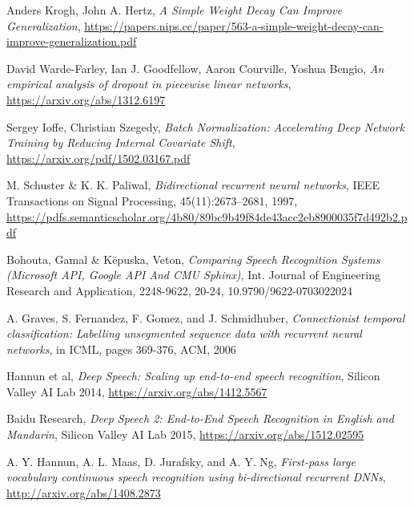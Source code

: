 \documentclass[licencjacka,en]{pracamgr}
\begin{document}
	\begin{thebibliography}{99}
		
		 Anders Krogh, John A. Hertz, \textit{A Simple Weight Decay Can Improve Generalization}, \href{https://papers.nips.cc/paper/563-a-simple-weight-decay-can-improve-generalization.pdf}{https://papers.nips.cc/paper/563-a-simple-weight-decay-can-improve-generalization.pdf}
		
		 David Warde-Farley, Ian J. Goodfellow, Aaron Courville, Yoshua Bengio, \textit{An empirical analysis of dropout in piecewise linear networks},  \href{https://arxiv.org/abs/1312.6197}{https://arxiv.org/abs/1312.6197}
		
		 Sergey Ioffe, Christian Szegedy, \textit{Batch Normalization: Accelerating Deep Network Training by Reducing Internal Covariate Shift},  \href{https://arxiv.org/pdf/1502.03167.pdf}{https://arxiv.org/pdf/1502.03167.pdf}
		
		 M. Schuster \& K. K. Paliwal, \textit{Bidirectional recurrent neural networks}, IEEE Transactions on Signal Processing, 45(11):2673–2681, 1997,  \href{https://pdfs.semanticscholar.org/4b80/89bc9b49f84de43acc2eb8900035f7d492b2.pdf}{https://pdfs.semanticscholar.org/4b80/89bc9b49f84de43acc2eb8900035f7d492b2.pdf}
		
		 Bohouta, Gamal \& Këpuska, Veton, \textit{Comparing Speech Recognition Systems (Microsoft API, Google API And CMU Sphinx)}, Int. Journal of Engineering Research and Application, 2248-9622, 20-24, 10.9790/9622-0703022024
		
		 A. Graves, S. Fernandez, F. Gomez, and J. Schmidhuber, \textit{Connectionist temporal classification:
			Labelling unsegmented sequence data with recurrent neural networks}, in ICML, pages 369-376, ACM, 2006
		
		 Hannun et al,
		\textit{Deep Speech: Scaling up end-to-end speech recognition}, Silicon Valley AI Lab 2014, \href{https://arxiv.org/abs/1412.5567}{https://arxiv.org/abs/1412.5567}
		
		 Baidu Research, \textit{Deep Speech 2: End-to-End Speech Recognition in English and Mandarin}, Silicon Valley AI Lab 2015, \href{https://arxiv.org/abs/1512.02595}{https://arxiv.org/abs/1512.02595}
		
		 A. Y. Hannun, A. L. Maas, D. Jurafsky, and A. Y. Ng, \textit{First-pass large vocabulary continuous speech recognition using bi-directional recurrent DNNs}, \href{http://arxiv.org/abs/1408.2873}{http://arxiv.org/abs/1408.2873}
		

\end{thebibliography}
\end{document}
